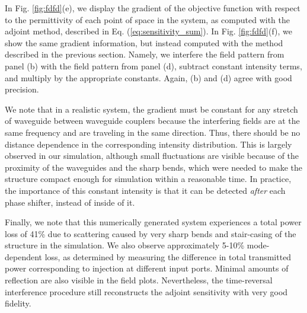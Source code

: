 In Fig. \ref{fig:fdfd}(e), we display the gradient of the objective function with respect to the permittivity of each point of space in the system, as computed with the adjoint method, described in Eq. (\ref{eq:sensitivity_sum}).  In Fig. \ref{fig:fdfd}(f), we show the same gradient information, but instead computed with the method described in the previous section.  Namely, we interfere the field pattern from panel (b) with the field pattern from panel (d), subtract constant intensity terms, and multiply by the appropriate constants.  Again, (b) and (d) agree with good precision.

We note that in a realistic system, the gradient must be constant for any stretch of waveguide between waveguide couplers because the interfering fields are at the same frequency and are traveling in the same direction.  Thus, there should be no distance dependence in the corresponding intensity distribution. This is largely observed in our simulation, although small fluctuations are visible because of the proximity of the waveguides and the sharp bends, which were needed to make the structure compact enough for simulation within a reasonable time. In practice, the importance of this constant intensity is that it can be detected \textit{after} each phase shifter, instead of inside of it.

Finally, we note that this numerically generated system experiences a total power loss of 41\% due to scattering caused by very sharp bends and stair-casing of the structure in the simulation.  We also observe approximately 5-10\% mode-dependent loss, as determined by measuring the difference in total transmitted power corresponding to injection at different input ports.  Minimal amounts of reflection are also visible in the field plots.  Nevertheless, the time-reversal interference procedure still reconstructs the adjoint sensitivity with very good fidelity.

